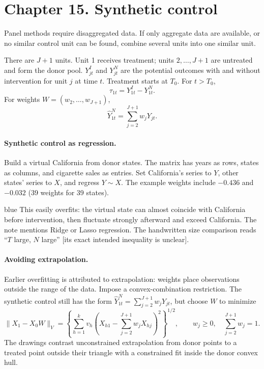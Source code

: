 {\section{Chapter 15. Synthetic control}
Panel methods require disaggregated data. If only aggregate data are available, or no similar control unit can be found, combine several units into one similar unit.

There are $J+1$ units. Unit 1 receives treatment; units $2,\ldots,J+1$ are untreated and form the donor pool. $Y_{jt}^{I}$ and $Y_{jt}^{N}$ are the potential outcomes with and without intervention for unit $j$ at time $t$. Treatment starts at $T_0$. For $t>T_0$,
\[\tau_{1t}=Y_{1t}^{I}-Y_{1t}^{N}.\]
 For weights $W=(w_2,\ldots,w_{J+1})$,
\[\widehat Y_{1t}^{N}=\sum_{j=2}^{J+1}w_jY_{jt}.\]

\paragraph{Synthetic control as regression.}
Build a virtual California from donor states. The matrix has years as rows, states as columns, and cigarette sales as entries. Set California's series to $Y$, other states' series to $X$, and regress $Y\sim X$. The example weights include $-0.436$ and $-0.032$ (39 weights for 39 states). 

\begin{inkblock}{blue}
This easily overfits: the virtual state can almost coincide with California before intervention, then fluctuate strongly afterward and exceed California. The note mentions Ridge or Lasso regression. The handwritten size comparison reads ``$T$ large, $N$ large'' [its exact intended inequality is unclear].
\end{inkblock}

\paragraph{Avoiding extrapolation.}
Earlier overfitting is attributed to extrapolation: weights place observations outside the range of the data. Impose a convex-combination restriction. The synthetic control still has the form $\widehat Y_{1t}^{N}=\sum_{j=2}^{J+1}w_jY_{jt}$, but choose $W$ to minimize
\[\|X_1-X_0W\|_V=
\left\{\sum_{h=1}^{k}v_h\left(X_{h1}-\sum_{j=2}^{J+1}w_jX_{hj}\right)^2\right\}^{1/2},
\qquad w_j\ge0,\quad\sum_{j=2}^{J+1}w_j=1.
\]
The drawings contrast unconstrained extrapolation from donor points to a treated point outside their triangle with a constrained fit inside the donor convex hull.

}

